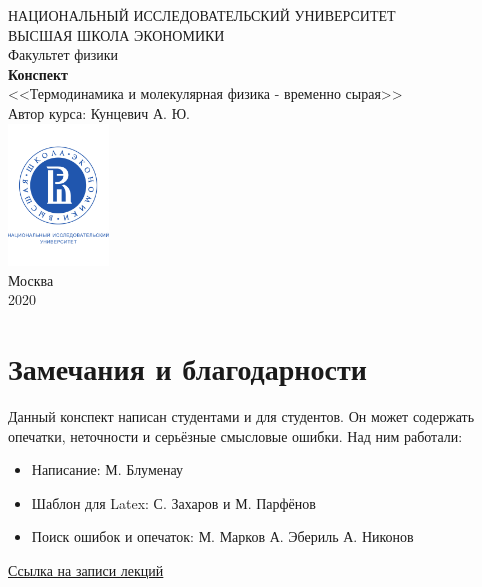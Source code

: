 \documentclass[a4paper, 12pt]{article}
\begin{document}
	\begin{titlepage}
		\begin{center}
			$$$$
			$$$$
			$$$$
			$$$$
			{\Large{НАЦИОНАЛЬНЫЙ ИССЛЕДОВАТЕЛЬСКИЙ УНИВЕРСИТЕТ}}\\
			\vspace{0.1cm}
			{\Large{ВЫСШАЯ ШКОЛА ЭКОНОМИКИ}}\\
			\vspace{0.25cm}
			{\large{Факультет физики}}\\
			\vspace{5.5cm}
			{\Huge\textbf{{Конспект}}}\\%
			\vspace{1cm}
			{\LARGE{<<Термодинамика и молекулярная физика - временно сырая>>}}\\%
			\vspace{1cm}
			{\LARGE{Автор курса: Кунцевич А. Ю.}}\\%
			\vspace{2cm}
			\vfill
			\includegraphics[width = 0.2\textwidth]{HSElogo}\\
			\vfill
			Москва\\
			2020
		\end{center}
	\end{titlepage}
	
	\tableofcontents
	\newpage
	\section*{Замечания и благодарности}
	Данный конспект написан студентами и для студентов. Он может содержать опечатки, неточности и серьёзные смысловые ошибки.
	Над ним работали:
	\begin{itemize}
		\item Написание:
		\subitem М. Блуменау 
		\item Шаблон для Latex:
		\subitem С. Захаров и М. Парфёнов
		\item Поиск ошибок и опечаток:
		\subitem М. Марков
		\subitem А. Эбериль
		\subitem А. Никонов
	\end{itemize}
	\href{https://drive.google.com/drive/folders/1YxoCMlbHhKd1kKbX7nwRKx5jfchXqmVf?usp=sharing}{Ссылка на записи лекций} 
	\newpage
\end{document}
